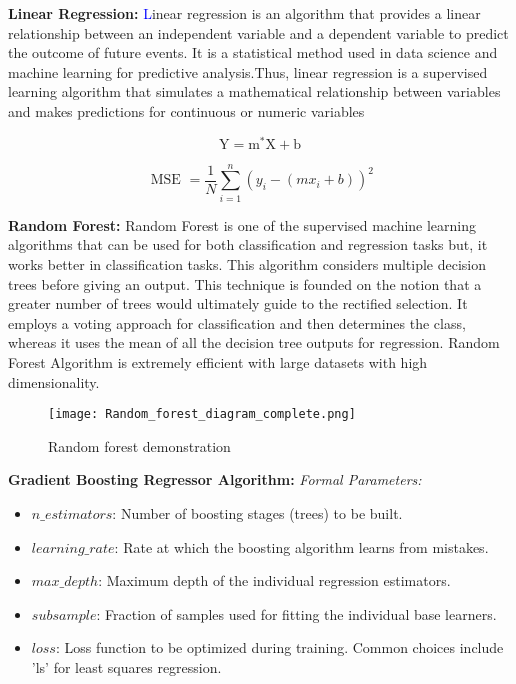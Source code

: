 \documentclass[conference]{IEEEtran}
\begin{document}
 
\item \textbf{ Linear Regression:}
\newline
  \textcolor{blue}
  Linear regression is an algorithm that provides a linear relationship between an independent variable and a dependent variable to predict the outcome of future events. It is a statistical method used in data science and machine learning for predictive analysis.Thus, linear regression is a supervised learning algorithm that simulates a mathematical relationship between variables and makes predictions for continuous or numeric variables{\citep{deekshatulu2013classification}}\newline
  
\begin{equation}
\mathrm{Y}=\mathrm{m}^* \mathrm{X}+\mathrm{b}
\end{equation}

\begin{equation}
\text { MSE }=\frac{1}{N} \sum_{i=1}^n\left(y_i-\left(m x_i+b\right)\right)^2
\end{equation}


\item \textbf{ Random Forest:}
\newline
Random Forest is one of the  supervised machine learning algorithms that can be used for both classification and regression tasks but, it works better in classification tasks. This algorithm considers multiple decision trees before giving an output. This technique is founded on the notion that a greater number of trees would ultimately guide to the rectified selection. It employs a voting approach for classification and then determines the class, whereas it uses the mean of all the decision tree outputs for regression\textcolor{blue}{\citep{jabbar2016prediction}}. Random Forest Algorithm is extremely efficient with large datasets with high dimensionality. \textcolor{blue}{\citep{asadi2021random}}
\begin{figure}[H]
\texttt{[image: Random\_forest\_diagram\_complete.png]}
\caption{Random forest demonstration \textcolor{blue}{\citep{ramalingam2018heart}}}
\label{random} 
\end{figure}



\item \textbf{Gradient Boosting Regressor Algorithm:}
\newline
\textit{Formal Parameters:}
\begin{itemize}
    \item $n\_estimators$: Number of boosting stages (trees) to be built.
    \item $learning\_rate$: Rate at which the boosting algorithm learns from mistakes.
    \item $max\_depth$: Maximum depth of the individual regression estimators.
    \item $subsample$: Fraction of samples used for fitting the individual base learners.
    \item $loss$: Loss function to be optimized during training. Common choices include 'ls' for least squares regression.
\end{itemize}
\end{document}
